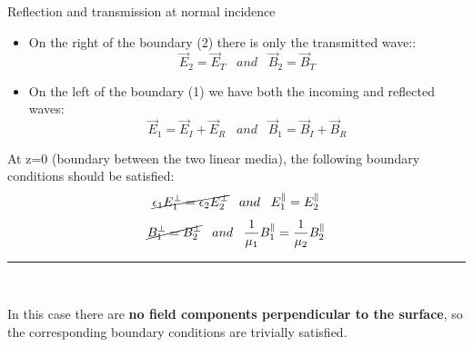 %
%
%

\begin{frame}{Reflection and transmission at normal incidence}

\begin{itemize}
         \item On the right of the boundary (2) there is only the transmitted wave::
              \begin{equation*}
                  \vec{E}_2 = \vec{E}_T \;\;\; and \;\;\; \vec{B}_2 = \vec{B}_T
              \end{equation*}
         \item On the left of the boundary (1)  we have both the incoming and reflected waves:
              \begin{equation*}
                  \vec{E}_1 = \vec{E}_I + \vec{E}_R \;\;\; and \;\;\; \vec{B}_1 = \vec{B}_I + \vec{B}_R
              \end{equation*}
\end{itemize}

At z=0 (boundary between the two linear media), the following
boundary conditions should be satisfied:
\begin{equation*}
    \cancel{\epsilon_1 E_1^{\perp} = \epsilon_2 E_2^{\perp}}
    \;\;\; and \;\;\;
    E_1^{\parallel} = E_2^{\parallel}
\end{equation*}
\begin{equation*}
    \cancel{B_1^{\perp} = B_2^{\perp}}
    \;\;\; and \;\;\;
    \frac{1}{\mu_1} B_1^{\parallel} = \frac{1}{\mu_2} B_2^{\parallel}
\end{equation*}

\noindent\rule{2cm}{0.4pt}\\
{\scriptsize
  In this case there are {\bf no field components perpendicular to the surface},
  so the corresponding boundary conditions are trivially satisfied.

}

\end{frame}

%
%
%

